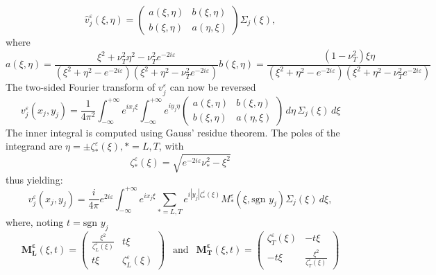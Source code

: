 \begin{equation}
\hat{v}^{\varepsilon}_j(\xi,\eta)=\begin{pmatrix}
a(\xi,\eta) & b(\xi,\eta) \\
b(\xi,\eta) & a(\eta,\xi)
\end{pmatrix} \Sigma_j(\xi),
\end{equation}
where
\begin{subequations}
\begin{equation}
a(\xi,\eta)=\frac{\xi^2+\nu_T^2 \eta^2-\nu_T^2e^{-2i\varepsilon}}{(\xi^2+\eta^2-e^{-2i\varepsilon})(\xi^2+\eta^2-\nu_T^2e^{-2i\varepsilon})}
\end{equation}
\begin{equation}
b(\xi,\eta)=\frac{(1-\nu_T^2)\xi \eta}{(\xi^2+\eta^2-e^{-2i\varepsilon})(\xi^2+\eta^2-\nu_T^2e^{-2i\varepsilon})}
\end{equation}
\end{subequations}
The two-sided Fourier transform of $v_j^{\varepsilon}$ can now be reversed
\begin{equation}
v_j^{\varepsilon}(x_j,y_j)=\frac{1}{4\pi^2}\int_{- \infty}^{+ \infty} e^{ix_j\xi} \int_{-\infty}^{+\infty}e^{iy_j\eta}\begin{pmatrix}
a(\xi,\eta) & b(\xi,\eta) \\
b(\xi,\eta) & a(\eta,\xi)
\end{pmatrix} \,d\eta\, \Sigma_j(\xi) \,d\xi
 \label{invdouble}
\end{equation}
The inner integral is computed using Gauss' residue theorem. The poles of the integrand are $\eta=\pm \zeta_*^{\varepsilon}(\xi), *=L,T$, with
\begin{equation}
\zeta_*^{\varepsilon}(\xi)=\sqrt{e^{-2i\varepsilon}\nu_*^2-\xi^2}
\label{defzetaeps}
\end{equation}
thus yielding:
\begin{equation}
v_j^{\varepsilon}(x_j,y_j)=\frac{i}{4\pi}e^{2i\varepsilon}\int_{-\infty}^{+\infty} e^{ix_j\xi}\sum_{*=L,T}e^{i|y_j|\zeta_*^{\varepsilon}(\xi)}M_*^{\varepsilon}(\xi,\mbox{sgn }y_j)\Sigma_j(\xi)\,d\xi,
\label{vjeps}
\end{equation}
where, noting $t=\mbox{sgn }y_j$
\begin{equation}
\mathbf{M_L^{\varepsilon}}(\xi,t)=\begin{pmatrix}
\frac{\xi^2}{\zeta_L^{\varepsilon}(\xi)} &t\xi \\
t\xi & \zeta_L^{\varepsilon}(\xi)
\end{pmatrix}
~~\mbox{  and  }~~
\mathbf{M_T^{\varepsilon}}(\xi,t)=\begin{pmatrix}
\zeta_T^{\varepsilon}(\xi) & -t\xi \\
-t\xi & \frac{\xi^2}{\zeta_T^{\varepsilon}(\xi)}
\end{pmatrix}
\label{M*eps}
\end{equation}
